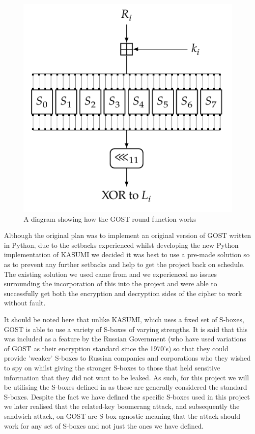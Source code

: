 \documentclass[10pt,journal,compsoc]{IEEEtran}
\begin{document}
\begin{figure}[hbt!]
    \centering
    \includegraphics[width=1\linewidth]{Figures/GOST.png}
    \caption{A diagram showing how the GOST round function works \cite{cryptoeprint:2016/1171-141}}
    \label{fig:GOST}
\end{figure}

Although the original plan was to implement an original version of GOST written in Python, due to the setbacks experienced whilst developing the new Python implementation of KASUMI we decided it was best to use a pre-made solution so as to prevent any further setbacks and help to get the project back on schedule. The existing solution we used came from \cite{githubGitHubBozhuGOSTPython} and we experienced no issues surrounding the incorporation of this into the project and were able to successfully get both the encryption and decryption sides of the cipher to work without fault. 

It should be noted here that unlike KASUMI, which uses a fixed set of S-boxes, GOST is able to use a variety of S-boxes of varying strengths. It is said that this was included as a feature by the Russian Government (who have used variations of GOST as their encryption standard since the 1970's) so that they could provide 'weaker' S-boxes to Russian companies and corporations who they wished to spy on whilst giving the stronger S-boxes to those that held sensitive information that they did not want to be leaked. As such, for this project we will be utilising the S-boxes defined in \cite{doi:https://doi.org/10.1002/9781119183471.ch14} as these are generally considered the standard S-boxes. Despite the fact we have defined the specific S-boxes used in this project we later realised that the related-key boomerang attack, and subsequently the sandwich attack, on GOST are S-box agnostic meaning that the attack should work for any set of S-boxes and not just the ones we have defined.
\end{document}
